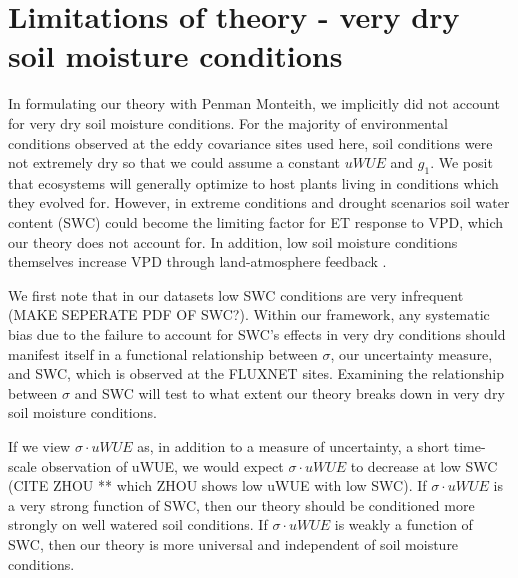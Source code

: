 \documentclass[draft,linenumbers]{gcbjournal}
\begin{document}
\section{Limitations of theory - very dry soil moisture conditions}
In formulating our theory with Penman Monteith, we implicitly did not account for very dry soil moisture conditions. For the majority of environmental conditions  observed at the eddy covariance sites used here, soil conditions were not extremely dry so that we could assume a constant $uWUE$ and $g_1$. We posit that ecosystems will generally optimize to host plants living in conditions which they evolved for. However, in extreme conditions and drought scenarios soil water content (SWC) could become the limiting factor for ET response to VPD, which our theory does not account for. In addition, low soil moisture conditions themselves increase VPD through land-atmosphere feedback \citep[][]{Bouchet_1963, Morton_1965, Brutsaert_1999, Ozdogan_2006, Salvucci_2013, Gentine_2016, Berg_2016}.

We first note that in our datasets low SWC conditions are very infrequent (MAKE SEPERATE PDF OF SWC?). Within our framework, any systematic bias due to the  failure to account for SWC's effects in very dry conditions should manifest itself in a functional relationship between $\sigma$, our uncertainty measure, and SWC, which is observed at the FLUXNET sites. Examining the relationship between $\sigma$ and SWC will test to what extent our theory breaks down in very dry soil moisture conditions.

If we view $\sigma \cdot uWUE$ as, in addition to a measure of uncertainty, a short time-scale observation of uWUE, we would expect $\sigma \cdot uWUE$ to decrease at low SWC (CITE ZHOU ** which ZHOU shows low uWUE with low SWC). If $\sigma \cdot uWUE$ is a very strong function of SWC, then our theory should be conditioned more strongly on well watered soil conditions. If $\sigma \cdot uWUE$ is weakly a function of SWC, then our theory is more universal and independent of soil moisture conditions.
\end{document}

